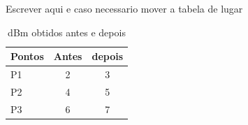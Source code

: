 Escrever aqui e caso necessario mover a tabela de lugar
\begin{table}[htbp]
\centering
    \begin{tabular}{l|c|c}
       \textbf{Pontos}  & \textbf{Antes} & \textbf{depois} \\\hline
        P1 & 2 & 3 \\\hline
        P2 & 4 & 5 \\\hline
        P3 & 6 & 7 

    \end{tabular}
    \caption{dBm obtidos antes e depois}
    \label{tab:placeholder}
\end{table}